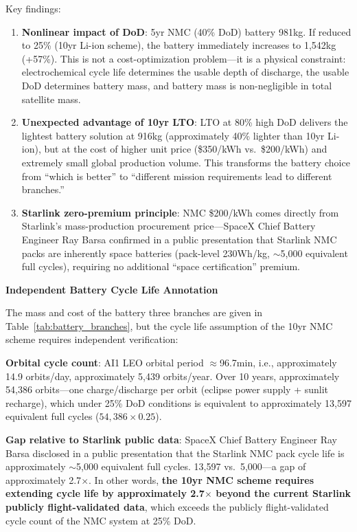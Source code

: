 Key findings:

\begin{enumerate}
    \item \textbf{Nonlinear impact of DoD}: 5yr NMC (40\% DoD) battery 981\;kg. If reduced to 25\% (10yr Li-ion scheme), the battery immediately increases to 1,542\;kg (+57\%). This is not a cost-optimization problem---it is a physical constraint: electrochemical cycle life determines the usable depth of discharge, the usable DoD determines battery mass, and battery mass is non-negligible in total satellite mass.
    \item \textbf{Unexpected advantage of 10yr LTO}: LTO at 80\% high DoD delivers the lightest battery solution at 916\;kg (approximately 40\% lighter than 10yr Li-ion), but at the cost of higher unit price (\$350/kWh vs.\ \$200/kWh) and extremely small global production volume. This transforms the battery choice from ``which is better'' to ``different mission requirements lead to different branches.''
    \item \textbf{Starlink zero-premium principle}: NMC \$200/kWh comes directly from Starlink's mass-production procurement price---SpaceX Chief Battery Engineer Ray Barsa confirmed in a public presentation that Starlink NMC packs are inherently space batteries (pack-level 230\;Wh/kg, $\sim$5,000 equivalent full cycles), requiring no additional ``space certification'' premium\cite{barsa2026starlink_battery}.
\end{enumerate}

\medskip
\noindent\textbf{Independent Battery Cycle Life Annotation}

The mass and cost of the battery three branches are given in Table~\ref{tab:battery_branches}, but the cycle life assumption of the 10yr NMC scheme requires independent verification:

\smallskip
\noindent\textbf{Orbital cycle count}: AI1 LEO orbital period $\approx$96.7\;min, i.e., approximately 14.9 orbits/day, approximately 5,439 orbits/year. Over 10 years, approximately 54,386 orbits---one charge/discharge per orbit (eclipse power supply + sunlit recharge), which under 25\% DoD conditions is equivalent to approximately 13,597 equivalent full cycles ($54{,}386 \times 0.25$).

\smallskip
\noindent\textbf{Gap relative to Starlink public data}: SpaceX Chief Battery Engineer Ray Barsa disclosed in a public presentation that the Starlink NMC pack cycle life is approximately $\sim$5,000 equivalent full cycles. 13,597 vs.\ 5,000---a gap of approximately 2.7$\times$. In other words, \textbf{the 10yr NMC scheme requires extending cycle life by approximately 2.7$\times$ beyond the current Starlink publicly flight-validated data}, which exceeds the publicly flight-validated cycle count of the NMC system at 25\% DoD.

